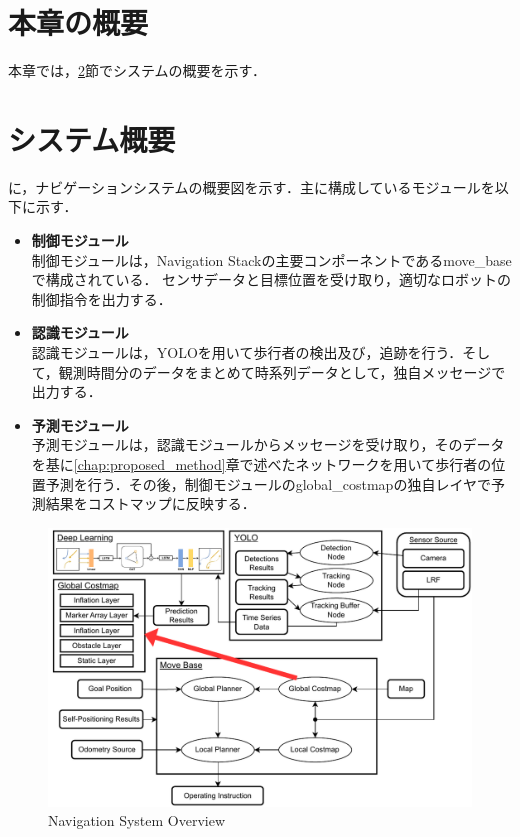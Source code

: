 
\section{本章の概要}
本章では，\ref{sec:nav-sys}節でシステムの概要を示す．


\section{システム概要}\label{sec:nav-sys}
に，ナビゲーションシステムの概要図を示す．主に構成しているモジュールを以下に示す．

\begin{itemize}
  \item \textbf{制御モジュール} \\
  制御モジュールは，Navigation Stackの主要コンポーネントであるmove\_baseで構成されている．
  センサデータと目標位置を受け取り，適切なロボットの制御指令を出力する．
  \item \textbf{認識モジュール} \\
  認識モジュールは，YOLOを用いて歩行者の検出及び，追跡を行う．そして，観測時間分のデータをまとめて時系列データとして，独自メッセージで出力する．
  \item \textbf{予測モジュール} \\
  予測モジュールは，認識モジュールからメッセージを受け取り，そのデータを基に\ref{chap:proposed_method}章で述べたネットワークを用いて歩行者の位置予測を行う．その後，制御モジュールのglobal\_costmapの独自レイヤで予測結果をコストマップに反映する．
\end{itemize}

\newpage

\vspace*{15pt}

\begin{figure}[H]
  \centering
 \includegraphics[keepaspectratio, scale=0.77]
      {images/application_system.pdf}
 \caption{Navigation System Overview}
 \label{Fig:nav-system}
\end{figure}  

